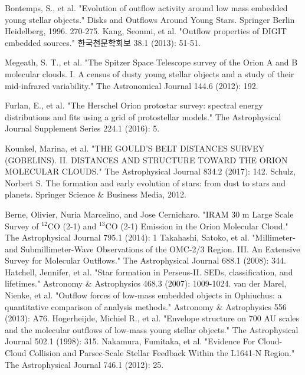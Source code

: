 \documentclass[twoside,11pt]{gshs_thesis}
\begin{document}
\clearpage
\begin{thebibliography}{99}\begin{onehalfspace}


 Bontemps, S., et al. "Evolution of outflow activity around low mass embedded young stellar objects." Disks and Outflows Around Young Stars. Springer Berlin Heidelberg, 1996. 270-275.
 Kang, Seonmi, et al. "Outflow properties of DIGIT embedded sources." 한국천문학회보 38.1 (2013): 51-51.

Megeath, S. T., et al. "The Spitzer Space Telescope survey of the Orion A and B molecular clouds. I. A census of dusty young stellar objects and a study of their mid-infrared variability." The Astronomical Journal 144.6 (2012): 192.

 Furlan, E., et al. "The Herschel Orion protostar survey: spectral energy distributions and fits using a grid of protostellar models." The Astrophysical Journal Supplement Series 224.1 (2016): 5.

Kounkel, Marina, et al. "THE GOULD’S BELT DISTANCES SURVEY (GOBELINS). II. DISTANCES AND STRUCTURE TOWARD THE ORION MOLECULAR CLOUDS." The Astrophysical Journal 834.2 (2017): 142.
 Schulz, Norbert S. The formation and early evolution of stars: from dust to stars and planets. Springer Science \& Business Media, 2012.

Berne, Olivier, Nuria Marcelino, and Jose Cernicharo. "IRAM 30 m Large Scale Survey of $^{12}$CO (2-1) and $^{13}$CO (2-1) Emission in the Orion Molecular Cloud." The Astrophysical Journal 795.1 (2014): 1
Takahashi, Satoko, et al. "Millimeter-and Submillimeter-Wave Observations of the OMC-2/3 Region. III. An Extensive Survey for Molecular Outflows." The Astrophysical Journal 688.1 (2008): 344.
 Hatchell, Jennifer, et al. "Star formation in Perseus-II. SEDs, classification, and lifetimes." Astronomy \& Astrophysics 468.3 (2007): 1009-1024.
 van der Marel, Nienke, et al. "Outflow forces of low-mass embedded objects in Ophiuchus: a quantitative comparison of analysis methods." Astronomy \& Astrophysics 556 (2013): A76.
Hogerheijde, Michiel R., et al. "Envelope structure on 700 AU scales and the molecular outflows of low-mass young stellar objects." The Astrophysical Journal 502.1 (1998): 315.
 Nakamura, Fumitaka, et al. "Evidence For Cloud-Cloud Collision and Parsec-Scale Stellar Feedback Within the L1641-N Region." The Astrophysical Journal 746.1 (2012): 25.


\end{onehalfspace}
\end{thebibliography}
\end{document}
